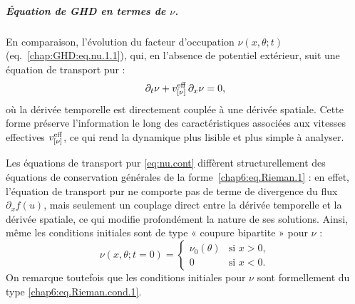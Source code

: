 \subparagraph{Équation de GHD en termes de $\nu$.}
En comparaison, l’évolution du facteur d'occupation $\nu(x,\theta;t)$ (eq.~\eqref{chap:GHD:eq.nu.1.1}), qui, en l’absence de potentiel extérieur, suit une équation de transport pur :
\begin{equation}
    \label{eq:nu.cont}
    \partial_t \nu + v^{\rm eff}_{[\nu]} \, \partial_x \nu = 0,
\end{equation}
où la dérivée temporelle est directement couplée à une dérivée spatiale. Cette forme préserve l'information le long des caractéristiques associées aux vitesses effectives $v^{\rm eff}_{[\nu]}$, ce qui rend la dynamique plus lisible et plus simple à analyser.

\medskip

Les équations de transport pur \eqref{eq:nu.cont} diffèrent structurellement des équations de conservation générales de la forme~\eqref{chap6:eq.Rieman.1} : en effet, l'équation de transport pur ne comporte pas de terme de divergence du flux $\partial_x f(u)$, mais seulement un couplage direct entre la dérivée temporelle et la dérivée spatiale, ce qui modifie profondément la nature de ses solutions.
Ainsi, même les conditions initiales sont de type « coupure bipartite » pour $\nu$ :
\begin{equation}
    \label{eq:nu.cont.init}
    \nu(x,\theta;t=0) = 
    \begin{cases}
        \nu_0(\theta) & \text{si } x > 0, \\
        0 & \text{si } x < 0.
    \end{cases}
\end{equation}
On remarque toutefois que les conditions initiales pour $\nu$ sont formellement du type \eqref{chap6:eq.Rieman.cond.1}.%

\medskip

